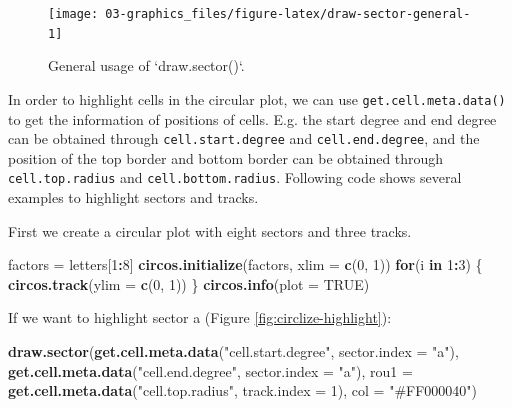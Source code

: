 \documentclass[]{book}
\newenvironment{Shaded}{\begin{snugshade}}{\end{snugshade}}
\newcommand{\KeywordTok}[1]{\textcolor[rgb]{0.13,0.29,0.53}{\textbf{#1}}}
\newcommand{\DataTypeTok}[1]{\textcolor[rgb]{0.13,0.29,0.53}{#1}}
\newcommand{\DecValTok}[1]{\textcolor[rgb]{0.00,0.00,0.81}{#1}}
\newcommand{\StringTok}[1]{\textcolor[rgb]{0.31,0.60,0.02}{#1}}
\newcommand{\OtherTok}[1]{\textcolor[rgb]{0.56,0.35,0.01}{#1}}
\newcommand{\ControlFlowTok}[1]{\textcolor[rgb]{0.13,0.29,0.53}{\textbf{#1}}}
\newcommand{\OperatorTok}[1]{\textcolor[rgb]{0.81,0.36,0.00}{\textbf{#1}}}
\newcommand{\NormalTok}[1]{#1}
\theoremstyle{definition}
\theoremstyle{definition}
\theoremstyle{remark}
\begin{document}
\begin{figure}

{\centering \texttt{[image: 03-graphics\_files/figure-latex/draw-sector-general-1]} 

}

\caption{General usage of `draw.sector()`.}\label{fig:draw-sector-general}
\end{figure}

In order to highlight cells in the circular plot, we can use
\texttt{get.cell.meta.data()} to get the information of positions of
cells. E.g. the start degree and end degree can be obtained through
\texttt{cell.start.degree} and \texttt{cell.end.degree}, and the
position of the top border and bottom border can be obtained through
\texttt{cell.top.radius} and \texttt{cell.bottom.radius}. Following code
shows several examples to highlight sectors and tracks.

First we create a circular plot with eight sectors and three tracks.

\begin{Shaded}
\begin{Highlighting}[]
\NormalTok{factors =}\StringTok{ }\NormalTok{letters[}\DecValTok{1}\OperatorTok{:}\DecValTok{8}\NormalTok{]}
\KeywordTok{circos.initialize}\NormalTok{(factors, }\DataTypeTok{xlim =} \KeywordTok{c}\NormalTok{(}\DecValTok{0}\NormalTok{, }\DecValTok{1}\NormalTok{))}
\ControlFlowTok{for}\NormalTok{(i }\ControlFlowTok{in} \DecValTok{1}\OperatorTok{:}\DecValTok{3}\NormalTok{) \{}
    \KeywordTok{circos.track}\NormalTok{(}\DataTypeTok{ylim =} \KeywordTok{c}\NormalTok{(}\DecValTok{0}\NormalTok{, }\DecValTok{1}\NormalTok{))}
\NormalTok{\}}
\KeywordTok{circos.info}\NormalTok{(}\DataTypeTok{plot =} \OtherTok{TRUE}\NormalTok{)}
\end{Highlighting}
\end{Shaded}

If we want to highlight sector a (Figure \ref{fig:circlize-highlight}):

\begin{Shaded}
\begin{Highlighting}[]
\KeywordTok{draw.sector}\NormalTok{(}\KeywordTok{get.cell.meta.data}\NormalTok{(}\StringTok{"cell.start.degree"}\NormalTok{, }\DataTypeTok{sector.index =} \StringTok{"a"}\NormalTok{),}
            \KeywordTok{get.cell.meta.data}\NormalTok{(}\StringTok{"cell.end.degree"}\NormalTok{, }\DataTypeTok{sector.index =} \StringTok{"a"}\NormalTok{),}
            \DataTypeTok{rou1 =} \KeywordTok{get.cell.meta.data}\NormalTok{(}\StringTok{"cell.top.radius"}\NormalTok{, }\DataTypeTok{track.index =} \DecValTok{1}\NormalTok{), }
            \DataTypeTok{col =} \StringTok{"#FF000040"}\NormalTok{)}
\end{Highlighting}
\end{Shaded}
\end{document}

